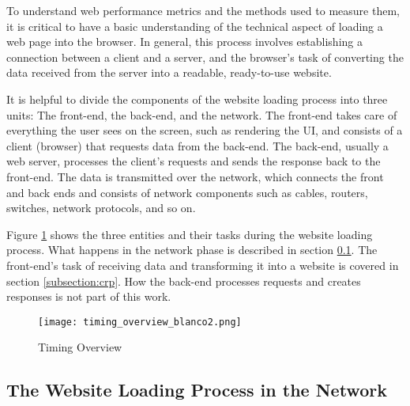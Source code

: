 
To understand web performance metrics and the methods used to measure them, it is critical to have a basic understanding of the technical aspect of loading a web page into the browser. 
In general, this process involves establishing a connection between a client and a server, and the browser's task of converting the data received from the server into a readable, ready-to-use website.


It is helpful to divide the components of the website loading process into three units: The front-end, the back-end, and the network. %
The front-end takes care of everything the user sees on the screen, such as rendering the UI, and consists of a client (browser) that requests data from the back-end.
The back-end, usually a web server, processes the client's requests and sends the response back to the front-end.
The data is transmitted over the network, which connects the front and back ends and consists of network components such as cables, routers, switches, network protocols, and so on.

Figure \ref{img:timing_overview} shows the three entities and their tasks during the website loading process.
What happens in the network phase is described in section \ref{subsection:network_process}.
The front-end's task of receiving data and transforming it into a website is covered in section \ref{subsection:crp}.
How the back-end processes requests and creates responses is not part of this work.

\begin{figure}[h!]
\begin{center}
\texttt{[image: timing\_overview\_blanco2.png]}
\caption{Timing Overview}
\label{img:timing_overview}
\end{center}
\end{figure}





\subsection{The Website Loading Process in the Network} %
\label{subsection:network_process}

